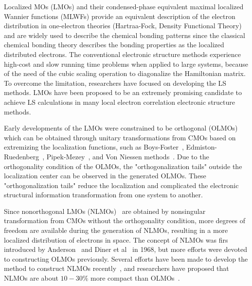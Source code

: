 \documentclass[aps,prl,reprint,amsmath,amssymb]{revtex4-1}
\begin{document}
Localized MOs (LMOs) and their condensed-phase equivalent maximal localized Wannier functions (MLWFs) provide an equivalent description of the electron distribution in one-electron theories (Hartraa-Fock, Density Functional Theory) and are widely used to describe the chemical bonding patterns since the classical chemical bonding theory describes the bonding properties as the localized distributed electrons.
The conventional electronic structure methods experience high-cost and slow running time problems when applied to large systems, because of the need of the cubic scaling operation to diagonalize the Hamiltonian matrix.
To overcome the limitation, researchers have focused on developing the LS methods.
LMOs have been proposed to be an extremely promising candidate to achieve LS calculations in many local electron correlation electronic structure methods.~\cite{wang1992simple, ordejon1993unconstrained, mauri1993orbital, mauri1994electronic, stechel1994n_scaling, goedecker1994efficient}

Early developments of the LMOs were constrained to be orthogonal (OLMOs)~\cite{weinstein1971localized} which can be obtained through unitary transformations from CMOs based on extremizing the localization functions, such as Boys-Foster~\cite{boys1960construction}, Edmiston-Ruedenberg~\cite{bytautas2002electron, bytautas2003split, edmiston1963localized}, Pipek-Mezey~\cite{pipek1989a_fast}, and Von Niessen methods~\cite{niessen1972density}.
Due to the orthogonality condition of the OLMOs, the "orthogonalization tails" outside the localization center can be observed in the generated OLMOs.
These "orthogonalization tails" reduce the localization and complicated the electronic structural information transformation from one system to another.

Since nonorthogonal LMOs (NLMOs)~\cite{anderson1968self, diner1968fully, magnasco1974localized, payne1977hartree, mehler1977self} are obtained by nonsingular transformation from CMOs without the orthogonality condition, more degrees of freedom are available during the generation of NLMOs, resulting in a more localized distribution of electrons in space.
The concept of NLMOs was firs introduced by Anderson~\cite{anderson1968self} and Diner et al~\cite{diner1968fully} in 1968, but more efforts were devoted to constructing OLMOs previously.
Several efforts have been made to develop the method to construct NLMOs recently~\cite{feng2004An_efficient, liu2000nonorthogonal, peng2013effective, hoyvik2017generalising}, and researchers have proposed that NLMOs are about $10-30 \%$ more compact than OLMOs~\cite{feng2004An_efficient, liu2000nonorthogonal}.
\end{document}
